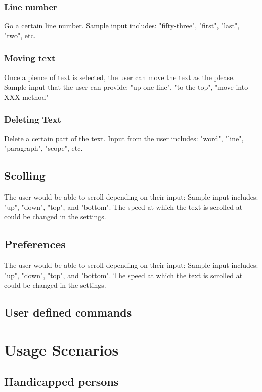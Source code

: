 \documentclass[11pt, oneside]{article}
\begin{document}
	\subsubsection{Line number}
	 Go a certain line number. Sample input includes: "fifty-three", "first", "last", "two", etc.

	\subsubsection{Moving text}
	 Once a pience of text is selected, the user can move the text as the please. Sample input that the user can provide: "up one line", "to the top", "move into XXX method"

	\subsubsection{Deleting Text}
	 Delete a certain part of the text. Input from the user includes: "word", "line", "paragraph", "scope", etc.

\subsection{Scolling}
 The user would be able to scroll depending on their input: Sample input includes: "up", "down", "top", and "bottom". The speed at which the text is scrolled at could be changed in the settings.

\subsection{Preferences}
 The user would be able to scroll depending on their input: Sample input includes: "up", "down", "top", and "bottom". The speed at which the text is scrolled at could be changed in the settings.

\subsection{User defined commands}



\section{Usage Scenarios}

\subsection{Handicapped persons}
\end{document}
